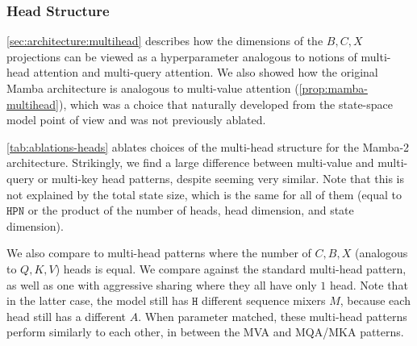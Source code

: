 {\subsubsection{Head Structure}

\cref{sec:architecture:multihead} describes how the dimensions of the $B, C, X$ projections can be viewed as a hyperparameter analogous to notions of multi-head attention and multi-query attention.
We also showed how the original Mamba architecture is analogous to multi-value attention (\cref{prop:mamba-multihead}),
which was a choice that naturally developed from the state-space model point of view and was not previously ablated.

\cref{tab:ablations-heads} ablates choices of the multi-head structure for the Mamba-2 architecture.
Strikingly, we find a large difference between multi-value and multi-query or multi-key head patterns,
despite seeming very similar.
Note that this is not explained by the total state size, which is the same for all of them (equal to $\mathtt{HPN}$ or the product of the number of heads, head dimension, and state dimension).

We also compare to multi-head patterns where the number of $C, B, X$ (analogous to $Q, K, V$) heads is equal.
We compare against the standard multi-head pattern, as well as one with aggressive sharing where they all have only $1$ head.
Note that in the latter case, the model still has $\mathtt{H}$ different sequence mixers $M$, because each head still has a different $A$.
When parameter matched, these multi-head patterns perform similarly to each other, in between the MVA and MQA/MKA patterns.

}
